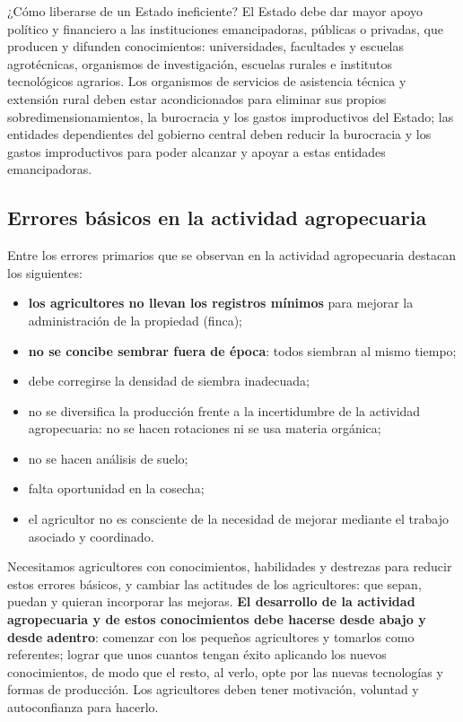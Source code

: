 \documentclass[
  man,
  floatsintext,
  longtable,
  a4paper,
  nolmodern,
  notxfonts,
  notimes,
  12pt,
  colorlinks=true,linkcolor=blue,citecolor=blue,urlcolor=blue]{apa7}
\providecommand{\tightlist}{%
  \setlength{\itemsep}{0pt}\setlength{\parskip}{0pt}}
\begin{document}
¿Cómo liberarse de un Estado ineficiente? El Estado debe dar mayor apoyo
político y financiero a las instituciones emancipadoras, públicas o
privadas, que producen y difunden conocimientos: universidades,
facultades y escuelas agrotécnicas, organismos de investigación,
escuelas rurales e institutos tecnológicos agrarios. Los organismos de
servicios de asistencia técnica y extensión rural deben estar
acondicionados para eliminar sus propios sobredimensionamientos, la
burocracia y los gastos improductivos del Estado; las entidades
dependientes del gobierno central deben reducir la burocracia y los
gastos improductivos para poder alcanzar y apoyar a estas entidades
emancipadoras.

\subsection{Errores básicos en la actividad
agropecuaria}\label{errores-buxe1sicos-en-la-actividad-agropecuaria}

Entre los errores primarios que se observan en la actividad agropecuaria
destacan los siguientes:

\begin{itemize}
\tightlist
\item
  \textbf{los agricultores no llevan los registros mínimos} para mejorar
  la administración de la propiedad (finca);
\item
  \textbf{no se concibe sembrar fuera de época}: todos siembran al mismo
  tiempo;
\item
  debe corregirse la densidad de siembra inadecuada;
\item
  no se diversifica la producción frente a la incertidumbre de la
  actividad agropecuaria: no se hacen rotaciones ni se usa materia
  orgánica;
\item
  no se hacen análisis de suelo;
\item
  falta oportunidad en la cosecha;
\item
  el agricultor no es consciente de la necesidad de mejorar mediante el
  trabajo asociado y coordinado.
\end{itemize}

Necesitamos agricultores con conocimientos, habilidades y destrezas para
reducir estos errores básicos, y cambiar las actitudes de los
agricultores: que sepan, puedan y quieran incorporar las mejoras.
\textbf{El desarrollo de la actividad agropecuaria y de estos
conocimientos debe hacerse desde abajo y desde adentro}: comenzar con
los pequeños agricultores y tomarlos como referentes; lograr que unos
cuantos tengan éxito aplicando los nuevos conocimientos, de modo que el
resto, al verlo, opte por las nuevas tecnologías y formas de producción.
Los agricultores deben tener motivación, voluntad y autoconfianza para
hacerlo.
\end{document}
